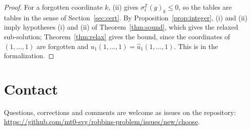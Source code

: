 \documentclass[11pt]{amsart}
\newcommand{\repo}{https://github.com/mt0-svg/robbins-problem}
\theoremstyle{definition}
\numberwithin{equation}{section}
\begin{document}
\begin{proof}
For a forgotten coordinate $k$, (ii) gives $\sigma^{\mathbb Z}_t(g)_k\le0$, so the tables are tables in the sense of Section~\ref{sec:cert}. By Proposition~\ref{prop:integer}, (i) and (ii) imply hypotheses (i) and (ii) of Theorem~\ref{thm:sound}, which gives the relaxed sub-solution; Theorem~\ref{thm:relax} gives the bound, since the coordinates of $(1,\dots,1)$ are forgotten and $u_1(1,\dots,1)=\hat u_1(1,\dots,1)$. This is  in the formalization.
\end{proof}

\section*{Contact}
Questions, corrections and comments are welcome as issues on the repository: \url{\repo/issues/new/choose}.



\end{document}

